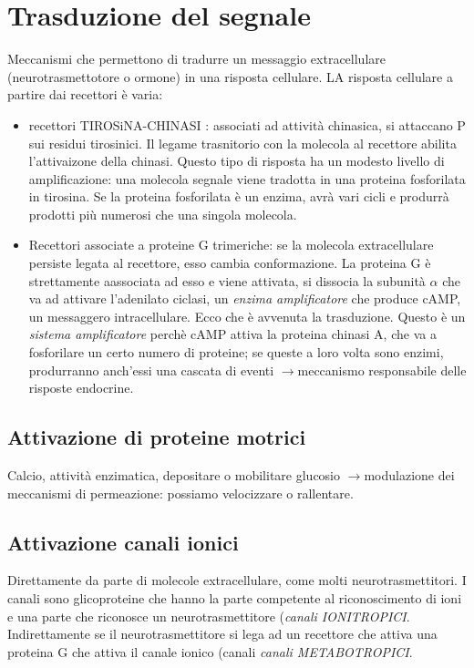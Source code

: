 \documentclass[a4paper,12pt]{article}
\newcommand{\lfreccia}{\ensuremath{\longrightarrow}}
\begin{document}
\section{Trasduzione del segnale}
Meccanismi che permettono di tradurre un messaggio extracellulare (neurotrasmettotore o ormone) in una risposta cellulare.
LA risposta cellulare a partire dai recettori è varia: 
\begin{itemize}
    \item{recettori TIROSiNA-CHINASI : associati ad attività chinasica, si attaccano P sui residui tirosinici. Il legame trasnitorio con la molecola al recettore abilita l'attivaizone della chinasi. Questo tipo di risposta ha un modesto livello di amplificazione: una molecola segnale viene tradotta in una proteina fosforilata in tirosina. Se la proteina fosforilata è un enzima, avrà vari cicli e produrrà prodotti più numerosi che una singola molecola.}
     \item{Recettori associate a proteine G trimeriche: se la molecola extracellulare persiste legata al recettore, esso cambia conformazione. La proteina G è strettamente aassociata ad esso e viene attivata, si dissocia la subunità $\alpha$ che va ad attivare l'adenilato ciclasi, un \emph{enzima amplificatore} che produce cAMP, un messaggero intracellulare. Ecco che è avvenuta la trasduzione. Questo è un \emph{sistema amplificatore} perchè cAMP attiva la proteina chinasi A, che va a fosforilare un certo numero di proteine; se queste a loro volta sono enzimi, produrranno anch'essi una cascata di eventi \lfreccia meccanismo responsabile delle risposte endocrine.}
\end{itemize}

\subsection{Attivazione di proteine motrici}
Calcio, attività enzimatica, depositare o mobilitare glucosio \lfreccia modulazione dei meccanismi di permeazione: possiamo velocizzare o rallentare.

\subsection{Attivazione canali ionici}
Direttamente da parte di molecole extracellulare, come molti neurotrasmettitori. I canali sono glicoproteine che hanno la parte competente al riconoscimento di ioni e una parte che riconosce un neurotrasmettitore (\emph{canali IONITROPICI}.
Indirettamente se il neurotrasmettitore si lega ad un recettore che attiva una proteina G che attiva il canale ionico (canali \emph{canali METABOTROPICI}.
\end{document}
